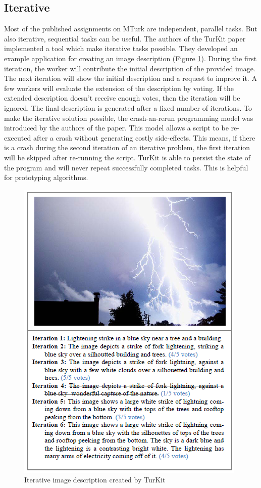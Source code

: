 \subsection{Iterative}
\label{iterative}
Most of the published assignments on MTurk are independent, parallel tasks. But also iterative, sequential tasks can be useful. The authors of the TurKit paper \cite{turkit} implemented a tool which make iterative tasks possible. They developed an example application for creating an image description (Figure \ref{turkit}). During the first iteration, the worker will contribute the initial description of the provided image. The next iteration will show the initial description and a request to improve it. A few workers will evaluate the extension of the description by voting. If the extended description doesn't receive enough votes, then the iteration will be ignored. The final description is generated after a fixed number of iterations. To make the iterative solution possible, the crash-an-rerun programming model was introduced by the authors of the paper. This model allows a script to be re-executed after a crash without generating costly side-effects. This means, if there is a crash during the second iteration of an iterative problem, the first iteration will be skipped after re-running the script. TurKit is able to persist the state of the program and will never repeat successfully completed tasks. This is helpful for prototyping algorithms.
\begin{figure}
\centering
\includegraphics[scale=0.65]{images/turkit_description_example.png}
\caption{Iterative image description created by TurKit}
\label{turkit}
\end{figure}

